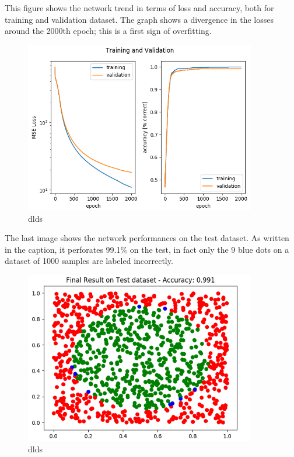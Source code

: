 \vspace{-0.5cm}
\begin{minipage}{0.45\textwidth} 
	This figure shows the network trend in terms of loss and accuracy, both for training and validation dataset. The graph shows a divergence in the losses around the 2000th epoch; this is a first sign of overfitting.
\end{minipage}
\begin{minipage}{0.5\textwidth} \raggedleft 
	\begin{figure}[H]
		\includegraphics[width=0.9\textwidth]{Images/LossAccFinal.png}
		\centering
		\caption{dlds}
		\centering
	\end{figure}
\end{minipage}

\vspace{-1cm}
\begin{minipage}{0.45\textwidth} 
	The last image shows the network performances on the test dataset. As written in the caption, it perforates 99.1\% on the test, in fact only the 9 blue dots on a dataset of 1000 samples are labeled incorrectly.
\end{minipage}
\begin{minipage}{0.5\textwidth} \raggedleft 
	\begin{figure}[H]
		\includegraphics[width=0.9\textwidth]{Images/FinalTestAccuracy.png}
		\centering
		\caption{dlds}
		\centering
	\end{figure}
\end{minipage}

